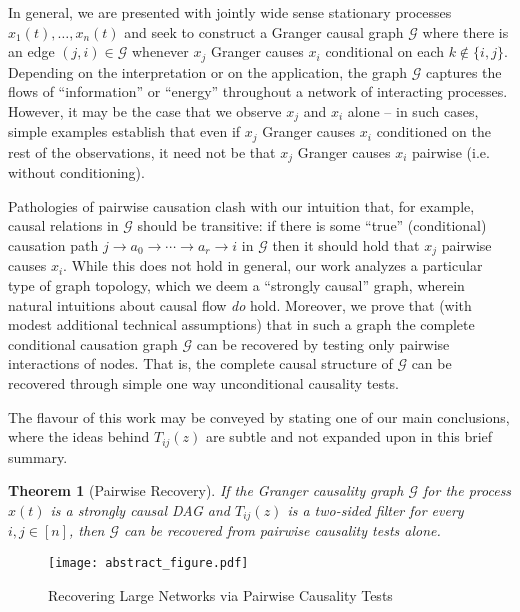 \documentclass[12pt]{article}
\newtheorem{theorem}{Theorem}
\def\gcg{\mathcal{G}}  %
\begin{document}
In general, we are presented with jointly wide sense stationary
processes $x_1(t), \ldots, x_n(t)$ and seek to construct a Granger
causal graph $\gcg$ where there is an edge $(j, i) \in \gcg$ whenever
$x_j$ Granger causes $x_i$ conditional on each $k \not\in \{i, j\}$.
Depending on the interpretation or on the application, the graph
$\gcg$ captures the flows of ``information'' or ``energy'' throughout
a network of interacting processes.  However, it may be the case that
we observe $x_j$ and $x_i$ alone -- in such cases, simple examples
establish that even if $x_j$ Granger causes $x_i$ conditioned on the
rest of the observations, it need not be that $x_j$ Granger causes
$x_i$ pairwise (i.e. without conditioning).

Pathologies of pairwise causation clash with our intuition that, for
example, causal relations in $\gcg$ should be transitive: if there is
some ``true'' (conditional) causation path
$j \rightarrow a_0 \rightarrow \cdots \rightarrow a_r \rightarrow i$
in $\gcg$ then it should hold that $x_j$ pairwise causes $x_i$.  While
this does not hold in general, our work analyzes a particular type of
graph topology, which we deem a ``strongly causal'' graph, wherein
natural intuitions about causal flow \textit{do} hold.  Moreover, we
prove that (with modest additional technical assumptions) that in such
a graph the complete conditional causation graph $\gcg$ can be
recovered by testing only pairwise interactions of nodes.  That is,
the complete causal structure of $\gcg$ can be recovered through
simple one way unconditional causality tests.

The flavour of this work may be conveyed by stating one of our main
conclusions, where the ideas behind $T_{ij}(z)$ are subtle and not
expanded upon in this brief summary.

\begin{theorem}[Pairwise Recovery]
  \label{thm:scg_recovery}
  If the Granger causality graph $\gcg$ for the process $x(t)$ is
  a strongly causal DAG and $T_{ij}(z)$ is a two-sided filter for every
  $i, j \in [n]$, then $\gcg$ can be recovered from pairwise causality
  tests alone.
\end{theorem}

\begin{figure}[h]
  \centering
  \caption{Recovering Large Networks via Pairwise Causality Tests}
  \label{fig:large_n_figure}
  \texttt{[image: abstract\_figure.pdf]}
\end{figure}
\end{document}
